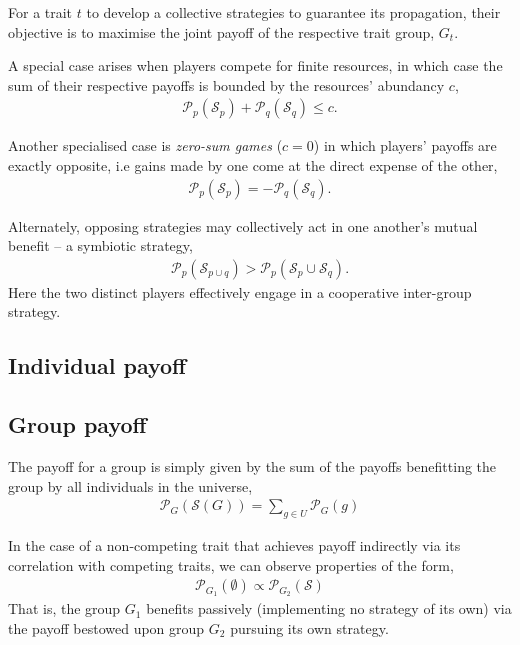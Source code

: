 \documentclass[twocolumn, aps, rmp, amsmath, amssymb, nofootinbib, superscriptaddress, longbibliography, floatfix, table-of-contents, eqsecnum]{revtex4-1}
\begin{document}
For a trait $t$ to develop a collective strategies to guarantee its propagation, their objective is to maximise the joint payoff of the respective trait group, $G_t$.

A special case arises when players compete for finite resources, in which case the sum of their respective payoffs is bounded by the resources' abundancy $c$,
\begin{align}
	\mathcal{P}_p(\mathcal{S}_p) + \mathcal{P}_q(\mathcal{S}_q) \leq c.
\end{align}

Another specialised case is \textit{zero-sum games} ($c=0$) in which players' payoffs are exactly opposite, i.e gains made by one come at the direct expense of the other,
\begin{align}
\mathcal{P}_p(\mathcal{S}_p) = -\mathcal{P}_q(\mathcal{S}_q).
\end{align}

Alternately, opposing strategies may collectively act in one another's mutual benefit -- a symbiotic strategy,
\begin{align}
\mathcal{P}_p(\mathcal{S}_{p\cup q}) > \mathcal{P}_p(\mathcal{S}_p\cup \mathcal{S}_q).
\end{align}
Here the two distinct players effectively engage in a cooperative inter-group strategy.

\subsection{Individual payoff}

\subsection{Group payoff}

The payoff for a group is simply given by the sum of the payoffs benefitting the group by all individuals in the universe,
\begin{align}
	\mathcal{P}_{G}(\mathcal{S}(G)) = \sum_{g\in U} \mathcal{P}_G(g)
\end{align}

In the case of a non-competing trait that achieves payoff indirectly via its correlation with competing traits, we can observe properties of the form,
\begin{align}
	\mathcal{P}_{G_1}(\emptyset) \propto \mathcal{P}_{G_2}(\mathcal{S})
\end{align}
That is, the group $G_1$ benefits passively (implementing no strategy of its own) via the payoff bestowed upon group $G_2$ pursuing its own strategy.
\end{document}
